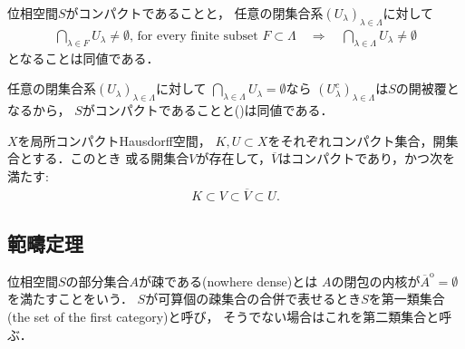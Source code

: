 	\begin{screen}
		\begin{thm}[有限交叉性]\label{thm:finite_intersection_property}
			位相空間$S$がコンパクトであることと，
			任意の閉集合系$(U_\lambda)_{\lambda \in \Lambda}$に対して
			\begin{align} 
				\bigcap_{\lambda \in F} U_\lambda \neq \emptyset
				\mbox{, for every finite subset $F \subset \Lambda$}
				\quad \Longrightarrow \quad \bigcap_{\lambda \in \Lambda} U_\lambda \neq \emptyset
				\label{eq:finite_intersection_property}
			\end{align}
			となることは同値である．
		\end{thm}
	\end{screen}
	
	\begin{prf}
		任意の閉集合系$(U_\lambda)_{\lambda \in \Lambda}$に対して
		$\bigcap_{\lambda \in \Lambda} U_\lambda = \emptyset$なら
		$(U_\lambda^c)_{\lambda \in \Lambda}$は$S$の開被覆となるから，
		$S$がコンパクトであることと()は同値である．
		\QED
	\end{prf}
	
	\begin{screen}
		\begin{thm}
			$X$を局所コンパクトHausdorff空間，
			$K,U \subset X$をそれぞれコンパクト集合，開集合とする．このとき
			或る開集合$V$が存在して，$\overline{V}$はコンパクトであり，かつ次を満たす:
			\begin{align}
				K \subset V \subset \overline{V} \subset U.
			\end{align}
		\end{thm}
	\end{screen}
	
	\begin{screen}
		\begin{thm}[可算コンパクト性の同値条件]
		\end{thm}
	\end{screen}
	
\subsection{範疇定理}
	\begin{screen}
		\begin{dfn}
			位相空間$S$の部分集合$A$が疎である(nowhere dense)とは
			$A$の閉包の内核が$\overline{A}^{\mathrm{o}} = \emptyset$を満たすことをいう．
			$S$が可算個の疎集合の合併で表せるとき$S$を第一類集合(the set of the first category)と呼び，
			そうでない場合はこれを第二類集合と呼ぶ．
		\end{dfn}
	\end{screen}
	
